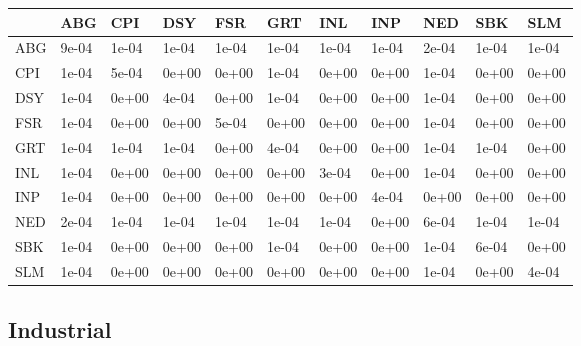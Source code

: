 \documentclass[11pt,preprint, authoryear]{elsarticle}
\let\origtable\table
\let\endorigtable\endtable
\renewenvironment{table}[1][2] {
    \expandafter\origtable\expandafter[H]
} {
    \endorigtable
}
\numberwithin{equation}{section}
\numberwithin{figure}{section}
\numberwithin{table}{section}
\begin{document}
\begin{table}[H]

\caption{\label{tab:Covariance Matrix_F}Covariance Matrix: Financial}
\centering
\begin{tabular}[t]{l|l|l|l|l|l|l|l|l|l|l}
\hline
  & ABG & CPI & DSY & FSR & GRT & INL & INP & NED & SBK & SLM\\
\hline
ABG & 9e-04 & 1e-04 & 1e-04 & 1e-04 & 1e-04 & 1e-04 & 1e-04 & 2e-04 & 1e-04 & 1e-04\\
\hline
CPI & 1e-04 & 5e-04 & 0e+00 & 0e+00 & 1e-04 & 0e+00 & 0e+00 & 1e-04 & 0e+00 & 0e+00\\
\hline
DSY & 1e-04 & 0e+00 & 4e-04 & 0e+00 & 1e-04 & 0e+00 & 0e+00 & 1e-04 & 0e+00 & 0e+00\\
\hline
FSR & 1e-04 & 0e+00 & 0e+00 & 5e-04 & 0e+00 & 0e+00 & 0e+00 & 1e-04 & 0e+00 & 0e+00\\
\hline
GRT & 1e-04 & 1e-04 & 1e-04 & 0e+00 & 4e-04 & 0e+00 & 0e+00 & 1e-04 & 1e-04 & 0e+00\\
\hline
INL & 1e-04 & 0e+00 & 0e+00 & 0e+00 & 0e+00 & 3e-04 & 0e+00 & 1e-04 & 0e+00 & 0e+00\\
\hline
INP & 1e-04 & 0e+00 & 0e+00 & 0e+00 & 0e+00 & 0e+00 & 4e-04 & 0e+00 & 0e+00 & 0e+00\\
\hline
NED & 2e-04 & 1e-04 & 1e-04 & 1e-04 & 1e-04 & 1e-04 & 0e+00 & 6e-04 & 1e-04 & 1e-04\\
\hline
SBK & 1e-04 & 0e+00 & 0e+00 & 0e+00 & 1e-04 & 0e+00 & 0e+00 & 1e-04 & 6e-04 & 0e+00\\
\hline
SLM & 1e-04 & 0e+00 & 0e+00 & 0e+00 & 0e+00 & 0e+00 & 0e+00 & 1e-04 & 0e+00 & 4e-04\\
\hline
\end{tabular}
\end{table}

\newpage

\hypertarget{industrial}{%
\subsection{Industrial}\label{industrial}}
\end{document}
